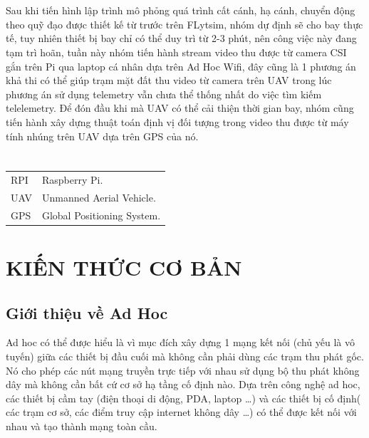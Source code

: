 \documentclass[12pt,a4paper]{report}
\begin{document}
\chapter*{}
\vskip 1cm
\hspace{25pt}Sau khi tiến hình lập trình mô phỏng quá trình cất cánh, hạ cánh, chuyển động theo quỹ đạo được thiết kế từ trước trên FLytsim, nhóm dự định sẽ cho bay thực tế, tuy nhiên thiết bị bay chỉ có thể duy trì từ 2-3 phút, nên công việc này đang tạm trì hoãn, tuần này nhóm tiến hành stream video thu được từ camera CSI gắn trên Pi qua laptop cá nhân dựa trên Ad Hoc Wifi, đây cũng là 1 phương án khả thi có thể giúp trạm mặt đất thu video từ camera trên UAV trong lúc phương án sử dụng telemetry vẫn chưa thể thống nhất do việc tìm kiếm telelemetry. Để đón đầu khi mà UAV có thể cải thiện thời gian bay, nhóm cũng tiến hành xây dựng thuật toán định vị đối tượng trong video thu được từ máy tính nhúng trên UAV dựa trên GPS của nó. 

\chapter*{}
\vskip 1cm
\begin{tabular}{l l }
RPI & Raspberry Pi.\\
UAV & Unmanned Aerial Vehicle.\\
GPS & Global Positioning System.\\
\end{tabular}

\tableofcontents
\chapter{KIẾN THỨC CƠ BẢN}         %

\section{Giới thiệu về Ad Hoc}
\hspace{25pt} Ad hoc có thể được hiểu là vì mục đích xây dựng 1 mạng kết nối (chủ yếu là vô tuyến) giữa các thiết bị đầu cuối mà không cần phải dùng các trạm thu phát gốc. Nó cho phép các nút mạng truyền trực tiếp với nhau sử dụng bộ thu phát không dây mà không cần bất cứ cơ sở hạ tầng cố định nào. Dựa trên công nghệ ad hoc, các thiết bị cầm tay (điện thoại di động, PDA, laptop …) và các thiết bị cố định( các trạm cơ sở, các điểm truy cập internet không dây …) có thể được kết nối với nhau và tạo thành mạng toàn cầu.
\end{document}
